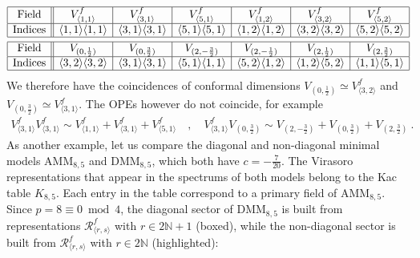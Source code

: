 \documentclass[12pt, a4paper]{article}
\theoremstyle{break}
\begin{document}
\begin{align}
& 
 \begin{array}{|c||c|c|c|c|c|c|}
  \hline 
  \text{Field} & V^f_{\langle 1,1\rangle} & V^f_{\langle 3,1\rangle} & V^f_{\langle 5,1\rangle}
  & V^f_{\langle 1,2\rangle} & V^f_{\langle 3,2\rangle} & V^f_{\langle 5,2\rangle} 
  \\
  \hline
  \text{Indices} & \langle 1,1\rangle\langle 1,1\rangle & \langle 3,1\rangle\langle 3,1\rangle & \langle 5,1\rangle\langle 5,1\rangle & \langle 1,2\rangle\langle 1,2\rangle & \langle 3,2\rangle\langle 3,2\rangle &
  \langle 5,2\rangle\langle 5,2\rangle 
  \\
  \hline 
 \end{array}
 \nonumber
 \\ & 
  \begin{array}{|c||c|c|c|c|c|c|}
  \hline 
  \text{Field} & V_{(0,\frac12)} & V_{(0,\frac32)} & V_{(2,-\frac32)} & V_{(2,-\frac12)} & V_{(2,\frac12)} & V_{(2,\frac32)} 
  \\
  \hline
  \text{Indices} & \langle 3,2\rangle\langle 3,2\rangle & \langle 3,1\rangle\langle 3,1\rangle &  \langle 5,1\rangle\langle 1,1\rangle & \langle 5,2\rangle\langle 1,2\rangle  & \langle 1,2\rangle\langle 5,2\rangle  &  \langle 1,1\rangle\langle 5,1\rangle
  \\
  \hline 
 \end{array}
\end{align}
We therefore have the coincidences of conformal dimensions $V_{(0,\frac12)}\simeq V^f_{\langle 3,2\rangle}$ and $V_{(0,\frac32)}\simeq V^f_{\langle 3,1\rangle}$. The OPEs however do not coincide, for example 
\begin{align}
 V^f_{\langle 3,1\rangle} V^f_{\langle 3,1\rangle} \sim V^f_{\langle 1,1\rangle} + V^f_{\langle 3, 1\rangle} + V^f_{\langle 5,1\rangle} \quad , \quad V^f_{\langle 3,1\rangle}V_{(0,\frac32)} \sim V_{(2,-\frac32)} + V_{(0,\frac32)} + V_{(2,\frac32)}\ . 
\end{align}
As another example, let us compare the diagonal and non-diagonal minimal models AMM$_{8,5}$ and DMM$_{8,5}$, which both have $c=-\frac{7}{20}$. The Virasoro representations that appear in the spectrums of both models belong to the Kac table $K_{8,5}$. Each entry in the table correspond to a primary field of AMM$_{8,5}$. Since $p=8\equiv 0\bmod 4$, the diagonal sector of DMM$_{8,5}$ is built from representations $\mathcal{R}^f_{\langle r,s\rangle}$ with $r\in 2\mathbb{N}+1$ (boxed), while the non-diagonal sector is built from $\mathcal{R}^f_{\langle r,s\rangle}$ with $r\in 2\mathbb{N}$ (highlighted):
\end{document}
